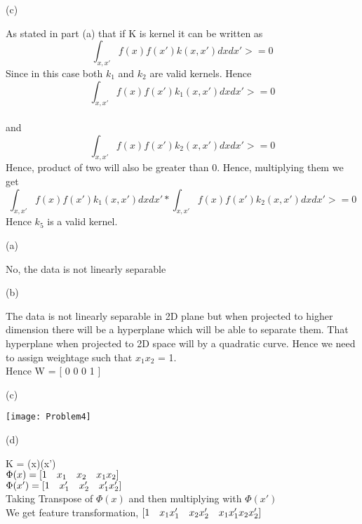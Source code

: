 \documentclass[12pt]{article}
\newenvironment{problem}[2][Problem]{\begin{trivlist}
\item[\hskip \labelsep {\bfseries #1}\hskip \labelsep {\bfseries #2.}]}{\end{trivlist}}
\begin{document}
\begin{problem} 2 (c)
\end{problem}
\begin{Answer}
As stated in part (a) that if K is kernel it can be written as\\
\begin{equation}
    \int_{x, x'} f(x) f(x') k(x, x') dx dx' >= 0
\end{equation}
Since in this case both $k_{1}$ and $k_{2}$ are valid kernels. Hence\\
\begin{equation}
    \int_{x, x'} f(x) f(x') k_{1}(x, x') dx dx' >= 0
\end{equation}\\
and 
\begin{equation}
    \int_{x, x'} f(x) f(x') k_{2}(x, x') dx dx' >= 0
\end{equation}
Hence, product of two will also be greater than 0. Hence, multiplying them we get\\
\begin{equation}
    \int_{x, x'} f(x) f(x') k_{1}(x, x') dx dx' * \int_{x, x'} f(x) f(x') k_{2}(x, x') dx dx' >= 0
\end{equation}
Hence $k_{5}$ is a valid kernel.
\end{Answer}

\begin{problem} 4 (a)
\end{problem}
\begin{Answer}
No, the data is not linearly separable
\end{Answer}

\begin{problem} 4 (b)
\end{problem}
\begin{Answer}
The data is not linearly separable in 2D plane but when projected to higher dimension there will be a hyperplane which will be able to separate them. That hyperplane when projected to 2D space will by a quadratic curve. Hence we need to assign weightage such that $x_{1}x_{2}$ = 1. \\
Hence W = [ 0 0 0 1 ]
\end{Answer}

\begin{problem} 4 (c)
\end{problem}
\begin{Answer}
\texttt{[image: Problem4]}
\end{Answer}

\begin{problem} 4 (d)
\end{problem}
\begin{Answer}
K = \Phi(x)\Phi(x')\\
$\Phi(x) = [ 1 \hskip 1em x_{1} \hskip 1em x_{2} \hskip 1em x_{1}x_{2} ]$\\
$\Phi(x') = [ 1 \hskip 1em x_{1}' \hskip 1em  x_{2}' \hskip 1em x_{1}'x_{2}' ]$\\
Taking Transpose of $\Phi(x)$ and then multiplying with $\Phi(x')$\\
We get feature transformation, $[1 \hskip 1em x_{1}x_{1}' \hskip 1em x_{2}x_{2}' \hskip 1em x_{1}x_{1}'x_{2}x_{2}']$
\end{Answer}
\end{document}
